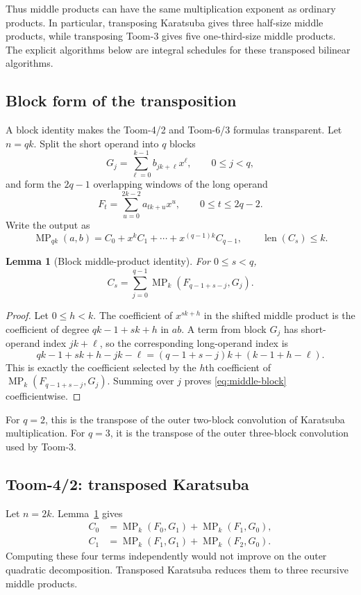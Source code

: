 \documentclass[11pt]{book}
\newtheorem{lemma}[theorem]{Lemma}
\theoremstyle{definition}
\newcommand{\len}{\operatorname{len}}
\begin{document}
Thus middle products can have the same multiplication exponent as ordinary
products.  In particular, transposing Karatsuba gives three half-size middle
products, while transposing Toom-3 gives five one-third-size middle products.
The explicit algorithms below are integral schedules for these transposed
bilinear algorithms.

\subsection{Block form of the transposition}

A block identity makes the Toom-4/2 and Toom-6/3 formulas transparent.  Let
$n=qk$.  Split the short operand into $q$ blocks
\[
 G_j=\sum_{\ell=0}^{k-1}b_{jk+\ell}x^\ell,
 \qquad 0\leq j<q,
\]
and form the $2q-1$ overlapping windows of the long operand
\[
 F_t=\sum_{u=0}^{2k-2}a_{tk+u}x^u,
 \qquad 0\leq t\leq2q-2.
\]
Write the output as
\[
 \operatorname{MP}_{qk}(a,b)=C_0+x^kC_1+\cdots+x^{(q-1)k}C_{q-1},
 \qquad \len(C_s)\leq k.
\]

\begin{lemma}[Block middle-product identity]\label{lem:middle-block}
For $0\leq s<q$,
\begin{equation}\label{eq:middle-block}
 C_s=\sum_{j=0}^{q-1}
 \operatorname{MP}_k(F_{q-1+s-j},G_j).
\end{equation}
\end{lemma}

\begin{proof}
Let $0\leq h<k$.  The coefficient of $x^{sk+h}$ in the shifted middle
product is the coefficient of degree
$qk-1+sk+h$ in $ab$.  A term from block $G_j$ has short-operand index
$jk+\ell$, so the corresponding long-operand index is
\[
 qk-1+sk+h-jk-\ell
 =(q-1+s-j)k+(k-1+h-\ell).
\]
This is exactly the coefficient selected by the $h$th coefficient of
$\operatorname{MP}_k(F_{q-1+s-j},G_j)$.  Summing over $j$ proves
\eqref{eq:middle-block} coefficientwise.
\end{proof}

For $q=2$, this is the transpose of the outer two-block convolution of
Karatsuba multiplication.  For $q=3$, it is the transpose of the outer
three-block convolution used by Toom-3.

\subsection{Toom-4/2: transposed Karatsuba}

Let $n=2k$.  Lemma~\ref{lem:middle-block} gives
\begin{align}
 C_0&=\operatorname{MP}_k(F_0,G_1)
      +\operatorname{MP}_k(F_1,G_0),\label{eq:t42-c0}\\
 C_1&=\operatorname{MP}_k(F_1,G_1)
      +\operatorname{MP}_k(F_2,G_0).\label{eq:t42-c1}
\end{align}
Computing these four terms independently would not improve on the outer
quadratic decomposition.  Transposed Karatsuba reduces them to three recursive
middle products.
\end{document}
